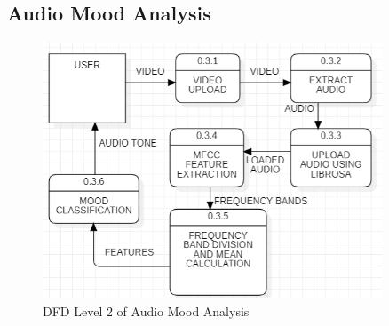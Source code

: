 \subsection{Audio Mood Analysis}

\begin{figure}[h!]  
    \centering
    \includegraphics[width=0.9\textwidth]{Images/DFD L2 AM.png}  
    \caption{DFD Level 2 of Audio Mood Analysis}
    \label{dfdl671}  %
\end{figure}

